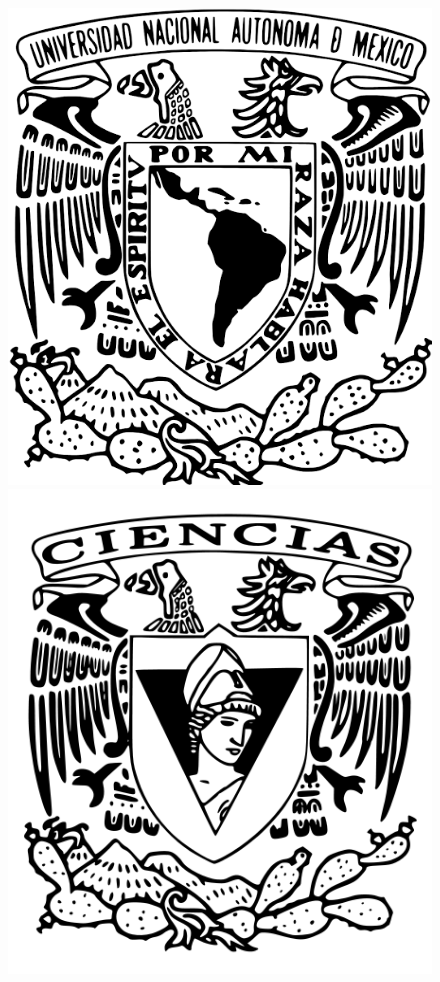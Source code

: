\documentclass{article}
\begin{document}
\begin{titlepage}

\begin{center}
\vspace*{0.10in}
\begin{figure}
\raggedleft
\includegraphics[scale=0.12]{unam.png}
\hspace{7.2cm}
\raggedright
\includegraphics[scale=0.15]{fac.png}    

\end{figure}
\end{center}
\end{titlepage}
\end{document}
